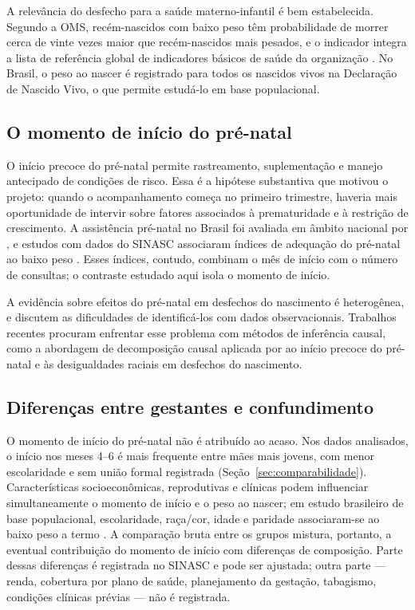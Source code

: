 \documentclass[11pt,a4paper]{article}
\begin{document}
A relevância do desfecho para a saúde materno-infantil é bem estabelecida. Segundo a OMS,
recém-nascidos com baixo peso têm probabilidade de morrer cerca de vinte vezes maior que
recém-nascidos mais pesados, e o indicador integra a lista de referência global de
indicadores básicos de saúde da organização \cite{who_lbw}. No Brasil, o peso ao nascer é
registrado para todos os nascidos vivos na Declaração de Nascido Vivo, o que permite
estudá-lo em base populacional.

\subsection{O momento de início do pré-natal}

O início precoce do pré-natal permite rastreamento, suplementação e manejo antecipado de
condições de risco. Essa é a hipótese substantiva que motivou o projeto: quando o
acompanhamento começa no primeiro trimestre, haveria mais oportunidade de intervir sobre
fatores associados à prematuridade e à restrição de crescimento. A assistência pré-natal
no Brasil foi avaliada em âmbito nacional por , e estudos com
dados do SINASC associaram índices de adequação do pré-natal ao baixo peso
\cite{vale2021}. Esses índices, contudo, combinam o mês de início com o número de
consultas; o contraste estudado aqui isola o momento de início.

A evidência sobre efeitos do pré-natal em desfechos do nascimento é heterogênea, e
 discutem as dificuldades de identificá-los com dados
observacionais. Trabalhos recentes procuram enfrentar esse problema com métodos de
inferência causal, como a abordagem de decomposição causal aplicada por
 ao início precoce do pré-natal e às desigualdades raciais em
desfechos do nascimento.

\subsection{Diferenças entre gestantes e confundimento}

O momento de início do pré-natal não é atribuído ao acaso. Nos dados analisados, o início
nos meses 4--6 é mais frequente entre mães mais jovens, com menor escolaridade e sem união
formal registrada (Seção~\ref{sec:comparabilidade}). Características socioeconômicas,
reprodutivas e clínicas podem influenciar simultaneamente o momento de início e o peso ao
nascer; em estudo brasileiro de base populacional, escolaridade, raça/cor, idade e
paridade associaram-se ao baixo peso a termo \cite{falcao2020}. A comparação bruta entre
os grupos mistura, portanto, a eventual contribuição do momento de início com diferenças
de composição. Parte dessas diferenças é registrada no SINASC e pode ser ajustada; outra
parte --- renda, cobertura por plano de saúde, planejamento da gestação, tabagismo,
condições clínicas prévias --- não é registrada.
\end{document}
